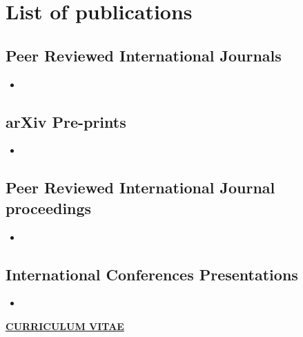 \documentclass[12pt, twoside,openright]{report}
\begin{document}





\chapter*{List of publications}

\section*{Peer Reviewed International Journals}
\begin{itemize}
   
    \item
    \end{itemize}
    
   \section*{arXiv Pre-prints} 
   \begin{itemize}
   \item
\end{itemize}

\section*{Peer Reviewed International Journal proceedings}
\begin{itemize}
    \item
\end{itemize}

\section*{International Conferences Presentations}
\begin{itemize}
    \item  
\end{itemize}


\newpage
\thispagestyle{empty}
\mbox{}


\newpage
\clearpage
\thispagestyle{empty}
\phantom{a}


\begin{center}
\large \underline{\textbf{CURRICULUM VITAE}}
\end{center}
\vspace*{0.1in}

\end{document}
